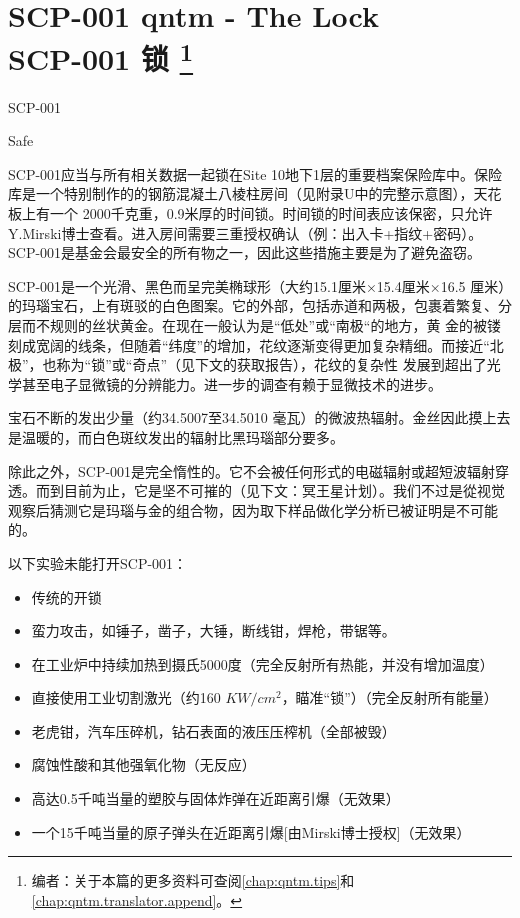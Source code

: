 \chapter[SCP-001 锁]{
	SCP-001 qntm - The Lock \\ 
	SCP-001 锁
	\protect\footnote{
		编者\QIS ：关于本篇的更多资料可查阅\autoref{chap:qntm.tips}和\autoref{chap:qntm.translator.append}。
	}
}

\label{chap:SCP-001.the.lock}

SCP-001

Safe

SCP-001应当与所有相关数据一起锁在Site 10地下1层的重要档案保险库中。保险库是一个特别制作的的钢筋混凝土八棱柱房间（见附录U中的完整示意图），天花板上有一个 2000千克重，0.9米厚的时间锁。时间锁的时间表应该保密，只允许Y.Mirski博士查看。进入房间需要三重授权确认（例：出入卡+指纹+密码）。SCP-001是基金会最安全的所有物之一，因此这些措施主要是为了避免盗窃。

SCP-001是一个光滑、黑色而呈完美椭球形（大约15.1厘米×15.4厘米×16.5 厘米）的玛瑙宝石，上有斑驳的白色图案。它的外部，包括赤道和两极，包裹着繁复、分层而不规则的丝状黄金。在现在一般认为是“低处”或“南极“的地方，黄 金的被镂刻成宽阔的线条，但随着“纬度”的增加，花纹逐渐变得更加复杂精细。而接近“北极”，也称为“锁”或“奇点”（见下文的获取报告），花纹的复杂性 发展到超出了光学甚至电子显微镜的分辨能力。进一步的调查有赖于显微技术的进步。

宝石不断的发出少量（约34.5007至34.5010 毫瓦）的微波热辐射。金丝因此摸上去是温暖的，而白色斑纹发出的辐射比黑玛瑙部分要多。

除此之外，SCP-001是完全惰性的。它不会被任何形式的电磁辐射或超短波辐射穿透。而到目前为止，它是坚不可摧的（见下文：冥王星计划）。我们不过是從视觉观察后猜测它是玛瑙与金的组合物，因为取下样品做化学分析已被证明是不可能的。


以下实验未能打开SCP-001：

\begin{itemize}
	 \item 传统的开锁
	 \item 蛮力攻击，如锤子，凿子，大锤，断线钳，焊枪，带锯等。
	 \item 在工业炉中持续加热到摄氏5000度（完全反射所有热能，并没有增加温度）
	 \item 直接使用工业切割激光（约160 ${KW}/{{cm}^2}$，瞄准“锁”）（完全反射所有能量）
	 \item 老虎钳，汽车压碎机，钻石表面的液压压榨机（全部被毁）
	 \item 腐蚀性酸和其他强氧化物（无反应）
	 \item 高达0.5千吨当量的塑胶与固体炸弹在近距离引爆（无效果）
	 \item 一个15千吨当量的原子弹头在近距离引爆[由Mirski博士授权]（无效果）
\end{itemize}


